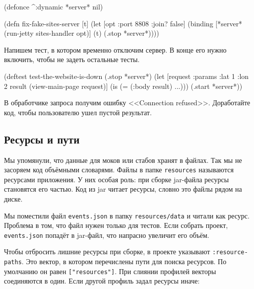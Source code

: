 
\begin{english}
  \begin{clojure}
(defonce ^:dynamic *server* nil)

(defn fix-fake-sites-server [t]
  (let [opt {:port 8808 :join? false}]
    (binding [*server* (run-jetty sites-handler opt)]
      (t)
      (.stop *server*))))
  \end{clojure}
\end{english}

Напишем тест, в котором временно отключим сервер. В конце его нужно включить,
чтобы не задеть остальные тесты.

\begin{english}
  \begin{clojure}
(deftest test-the-website-is-down
  (.stop *server*)
  (let [request {:params {:lat 1 :lon 2}}
        result (view-main-page request)]
    (is (= (:body result) {...})))
  (.start *server*))
  \end{clojure}
\end{english}

В обработчике запроса получим ошибку <<Connection refused>>. Доработайте код,
чтобы пользователю ушел пустой результат.

\subsection{Ресурсы и пути}

\label{resources}


Мы упомянули, что данные для моков или стабов хранят в файлах. Так мы не
засоряем код объёмными словарями. Файлы в папке \verb|resources| называются
ресурсами приложения. У них особая роль: при сборке jar-файла ресурсы становятся
его частью. Код из jar читает ресурсы, словно это файлы рядом на диске.

Мы поместили файл \verb|events.json| в папку \verb|resources/data| и читали
как ресурс. Проблема в том, что файл нужен только для тестов. Если собрать
проект, \verb|events.json| попадёт в jar-файл, что напрасно увеличит его
объём.

Чтобы отбросить лишние ресурсы при сборке, в проекте указывают
\verb|:resource-paths|. Это вектор, в котором перечислены пути для поиска
ресурсов. По умолчанию он равен \verb|["resources"]|. При слиянии профилей
векторы соединяются в один. Если другой профиль задал ресурсы иначе:

